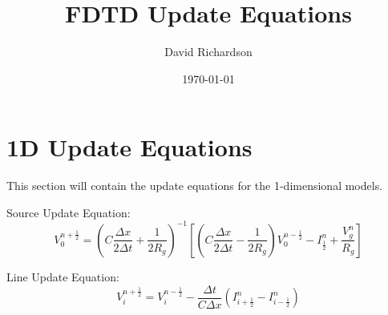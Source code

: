 \documentclass{article}
\title{FDTD Update Equations}
\author{David Richardson}
\date{\today}
\begin{document}
\maketitle

\section{1D Update Equations}

This section will contain the update equations for the 1-dimensional models.

Source Update Equation:
\begin{equation}
    V_0^{n+\frac{1}{2}}=(C\frac{\Delta x}{2\Delta t}+\frac{1}{2R_g})^{-1}
    [(C\frac{\Delta x}{2\Delta
    t}-\frac{1}{2R_g})V_0^{n-\frac{1}{2}}-I_{\frac{1}{2}}^n+\frac{V_g^n}{R_g}]
\end{equation}

Line Update Equation:
\begin{equation}
    V_i^{n+\frac{1}{2}}=V_i^{n-\frac{1}{2}}-\frac{\Delta t}{C\Delta
    x}(I_{i+\frac{1}{2}}^n-I_{i-\frac{1}{2}}^n)
\end{equation}
\end{document}
